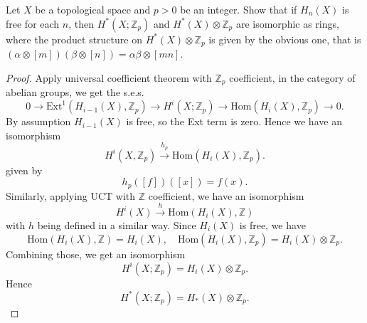 \begin{problem}
	Let $X$ be a topological space and $p>0$ be an integer. Show that if $H_n(X)$ is free for each $n$, then $H^*\left(X ; \mathbb{Z}_p\right)$ and $H^*(X) \otimes \mathbb{Z}_p$ are isomorphic as rings, where the product structure on $H^*(X) \otimes \mathbb{Z}_p$ is given by the obvious one, that is $(\alpha \otimes[m])(\beta \otimes[n])=\alpha \beta \otimes[m n]$.
\end{problem}
\begin{proof}
	Apply universal coefficient theorem with $\mathbb{Z}_p$ coefficient, in the category of abelian groups, we get the s.e.s.
	\[
		0 \to  \text{Ext}^1(H_{i - 1}(X), \mathbb{Z}_p) \to  H^i(X; \mathbb{Z}_p) \to \text{Hom}(H_i(X), \mathbb{Z}_p) \to 0
	.\] 
	By assumption $H_{i - 1}(X)$ is free, so the Ext term is zero. Hence we have an isomorphism
	\[
		H^i(X, \mathbb{Z}_p) \xrightarrow{h_p} \text{Hom}(H_i(X), \mathbb{Z}_p)
	.\] 
	given by
	\[
		h_p([f])([x]) = f(x)
	.\] 
	Similarly, applying UCT with $\mathbb{Z}$ coefficient, we have an isomorphism
	\[
		H^i(X) \xrightarrow{h} \text{Hom}(H_i(X), \mathbb{Z})
	\] 
	with $h$ being defined in a similar way.
Since $H_i(X)$ is free, we have
\[
	\text{Hom}(H_i(X), \mathbb{Z}) = H_i(X), \quad
	\text{Hom}(H_i(X), \mathbb{Z}_p) = H_i(X) \otimes \mathbb{Z}_p
.\] 
Combining those, we get an isomorphism
\[
	H^i(X; \mathbb{Z}_p) = H_i(X) \otimes \mathbb{Z}_p
.\] 
Hence
\[
	H^*(X; \mathbb{Z}_p) = H_{*}(X) \otimes \mathbb{Z}_p
.\] 
\end{proof}


